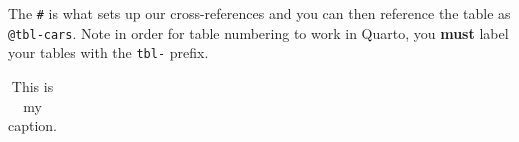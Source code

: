 \documentclass[
  letterpaper,
  11pt,
  english,
  singlespacing,
  headsepline]{MastersDoctoralThesis}
\begin{document}
The \texttt{\#\textbar{}} is what sets up our cross-references and you
can then reference the table as \texttt{@tbl-cars}. Note in order for
table numbering to work in Quarto, you \textbf{must} label your tables
with the \texttt{tbl-} prefix.

\begin{longtable}[]{@{}
  >{\raggedright\arraybackslash}p{}
  >{\raggedleft\arraybackslash}p{}
  >{\raggedleft\arraybackslash}p{}
  >{\raggedleft\arraybackslash}p{}
  >{\raggedleft\arraybackslash}p{}
  >{\raggedleft\arraybackslash}p{}
  >{\raggedleft\arraybackslash}p{}
  >{\raggedleft\arraybackslash}p{}
  >{\raggedleft\arraybackslash}p{}
  >{\raggedleft\arraybackslash}p{}
  >{\raggedleft\arraybackslash}p{}
  >{\raggedleft\arraybackslash}p{}@{}}

\caption{\label{tbl-cars}This is my caption.}

\tabularnewline


\end{longtable}
\end{document}
